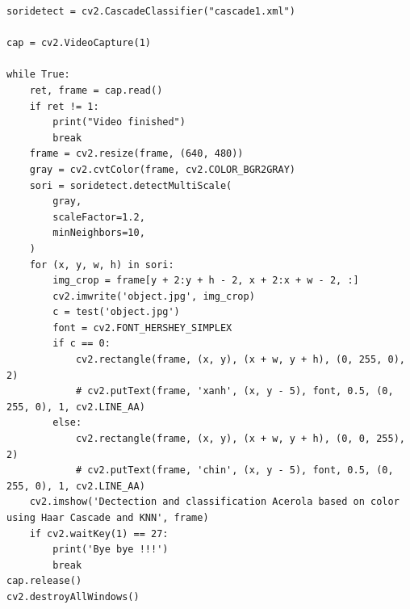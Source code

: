 \documentclass[12pt,a4paper]{article}
\begin{document}
\begin{lstlisting}
soridetect = cv2.CascadeClassifier("cascade1.xml")

cap = cv2.VideoCapture(1)

while True:
    ret, frame = cap.read()
    if ret != 1:
        print("Video finished")
        break
    frame = cv2.resize(frame, (640, 480))
    gray = cv2.cvtColor(frame, cv2.COLOR_BGR2GRAY)
    sori = soridetect.detectMultiScale(
        gray,
        scaleFactor=1.2,
        minNeighbors=10,
    )
    for (x, y, w, h) in sori:
        img_crop = frame[y + 2:y + h - 2, x + 2:x + w - 2, :]
        cv2.imwrite('object.jpg', img_crop)
        c = test('object.jpg')
        font = cv2.FONT_HERSHEY_SIMPLEX
        if c == 0:
            cv2.rectangle(frame, (x, y), (x + w, y + h), (0, 255, 0), 2)
            # cv2.putText(frame, 'xanh', (x, y - 5), font, 0.5, (0, 255, 0), 1, cv2.LINE_AA)
        else:
            cv2.rectangle(frame, (x, y), (x + w, y + h), (0, 0, 255), 2)
            # cv2.putText(frame, 'chin', (x, y - 5), font, 0.5, (0, 255, 0), 1, cv2.LINE_AA)
    cv2.imshow('Dectection and classification Acerola based on color using Haar Cascade and KNN', frame)
    if cv2.waitKey(1) == 27:
        print('Bye bye !!!')
        break
cap.release()
cv2.destroyAllWindows()
\end{lstlisting}
\end{document}
